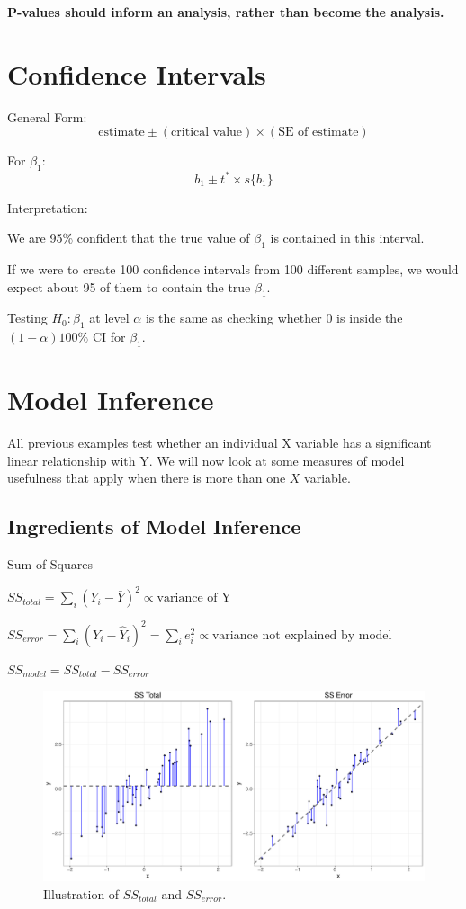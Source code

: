\documentclass[12pt]{../notes}
\begin{document}
\nspace
\textbf{P-values should inform an analysis, rather than become the analysis.}

\section*{Confidence Intervals}

\bi
\item General Form:
\[
\text{estimate} \pm (\text{critical value})\times(\text{SE of estimate})
\]
\item For $\beta_1$:
\[b_1 \pm t^*\times s\{b_1\}\]
\item Interpretation:
\bi
\item We are 95\% confident that the true value of $\beta_1$ is contained in this interval. 
\item If we were to create 100 confidence intervals from 100 different samples, we would expect about 95 of them to contain the true $\beta_1.$
\ei
\ei

\nspace
Testing $H_0: \beta_1$ at level $\alpha$ is the same as checking whether 0 is inside the $(1-\alpha)100\%$ CI for $\beta_1$. 

\section*{Model Inference}
All previous examples test whether an individual X variable has a significant linear relationship with Y. We will now look at some measures of model usefulness that apply when there is more than one $X$ variable. 

\subsection*{Ingredients of Model Inference}
\bi
\item Sum of Squares
\bi
\item $SS_{total} = \sum_i\left(Y_i - \bar{Y}\right)^2 \propto \text{variance of Y}$
\item $SS_{error} = \sum_i\left(Y_i - \hat{Y}_i\right)^2 = \sum_ie_i^2 \propto \text{variance not explained by model}$
\item $SS_{model} = SS_{total} - SS_{error}$
\ei
\ei

\begin{figure}[H]
\includegraphics[width=\textwidth]{figures/module2/ssError.pdf}
\caption{Illustration of $SS_{total}$ and $SS_{error}$.}
\end{figure}
\end{document}
